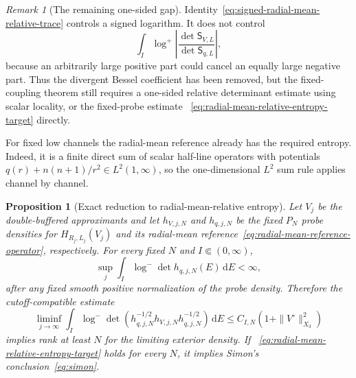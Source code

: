 \documentclass[11pt]{article}
\newcommand{\dd}{\,\mathrm d}
\newtheorem{proposition}[theorem]{Proposition}
\theoremstyle{definition}
\theoremstyle{remark}
\newtheorem{remark}[theorem]{Remark}
\begin{document}
\begin{remark}[The remaining one-sided gap]
Identity~\eqref{eq:signed-radial-mean-relative-trace} controls a signed
logarithm.  It does not control
\begin{equation}
 \int_I\log^+\left|\frac{\det\mathsf S_{V,L}}
                           {\det\mathsf S_{q,L}}\right|,
 \label{eq:relative-transmission-positive-part-gap}
\end{equation}
because an arbitrarily large positive part could cancel an equally large
negative part.  Thus the divergent Bessel coefficient has been removed, but
the fixed-coupling theorem still requires a one-sided relative determinant
estimate using scalar locality, or the fixed-probe estimate
~\eqref{eq:radial-mean-relative-entropy-target} directly.
\end{remark}

For fixed low channels the radial-mean reference already has the required
entropy.  Indeed, it is a finite direct sum of scalar half-line operators with
potentials $q(r)+n(n+1)/r^2\in L^2(1,\infty)$, so the one-dimensional $L^2$
sum rule applies channel by channel.

\begin{proposition}[Exact reduction to radial-mean-relative entropy]
\label{prop:radial-mean-relative-reduction}
Let $V_j$ be the double-buffered approximants and let $h_{V,j,N}$ and
$h_{q,j,N}$ be the fixed $P_N$ probe densities for $H_{R_j,L_j}(V_j)$ and its
radial-mean reference~\eqref{eq:radial-mean-reference-operator}, respectively.
For every fixed $N$ and $I\Subset(0,\infty)$,
\begin{equation}
 \sup_j\int_I\log^-\det h_{q,j,N}(E)\dd E<\infty,
 \label{eq:radial-mean-base-entropy}
\end{equation}
after any fixed smooth positive normalization of the probe density.  Therefore
the cutoff-compatible estimate
\begin{equation}
 \liminf_{j\to\infty}\int_I\log^-\det\!\left(
 h_{q,j,N}^{-1/2}h_{V,j,N}h_{q,j,N}^{-1/2}\right)\dd E
 \leq C_{I,N}\left(1+\|V^\circ\|_{X_3}^2\right)
 \label{eq:radial-mean-relative-entropy-target}
\end{equation}
implies rank at least $N$ for the limiting exterior density.  If
~\eqref{eq:radial-mean-relative-entropy-target} holds for every $N$, it implies
Simon's conclusion~\eqref{eq:simon}.
\end{proposition}
\end{document}
